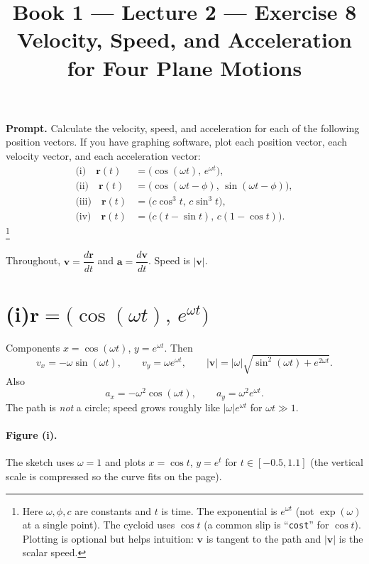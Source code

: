 \documentclass[11pt]{article}
\title{\textbf{Book 1 --- Lecture 2 --- Exercise 8}\\[2mm]
\large Velocity, Speed, and Acceleration for Four Plane Motions}
\author{}
\date{}
\newcommand{\promptbox}[1]{%
  \begin{savenotes}%
  \begingroup\setlength{\fboxsep}{10pt}\noindent
  \colorbox{blue!8}{\parbox{\dimexpr\linewidth-2\fboxsep\relax}{\textbf{Prompt. }#1}}
  \endgroup
  \end{savenotes}%
}
\begin{document}
\maketitle

\promptbox{Calculate the velocity, speed, and acceleration for each of the
following position vectors. If you have graphing software, plot each position
vector, each velocity vector, and each acceleration vector:
\begin{align*}
\text{(i)}\quad \mathbf{r}(t) &= \bigl(\cos(\omega t),\,e^{\omega t}\bigr),\\
\text{(ii)}\quad \mathbf{r}(t) &= \bigl(\cos(\omega t-\phi),\,\sin(\omega t-\phi)\bigr),\\
\text{(iii)}\quad \mathbf{r}(t) &= \bigl(c\cos^3 t,\,c\sin^3 t\bigr),\\
\text{(iv)}\quad \mathbf{r}(t) &= \bigl(c(t-\sin t),\,c(1-\cos t)\bigr).
\end{align*}
\footnote{Here \(\omega,\phi,c\) are constants and \(t\) is time. The exponential
is \(e^{\omega t}\) (not \(\exp(\omega)\) at a single point). The cycloid uses
\(\cos t\) (a common slip is ``\texttt{cost}'' for \(\cos t\)). Plotting is
optional but helps intuition: \(\mathbf{v}\) is tangent to the path and
\(|\mathbf{v}|\) is the scalar speed.}}

Throughout, \(\mathbf{v}=\dfrac{d\mathbf{r}}{dt}\) and
\(\mathbf{a}=\dfrac{d\mathbf{v}}{dt}\). Speed is \(|\mathbf{v}|\).

\section*{(i)\quad \(\mathbf{r}=\bigl(\cos(\omega t),\,e^{\omega t}\bigr)\)}
Components \(x=\cos(\omega t)\), \(y=e^{\omega t}\). Then
\[
v_x=-\omega\sin(\omega t),\qquad v_y=\omega e^{\omega t},
\qquad
|\mathbf{v}|=|\omega|\sqrt{\sin^2(\omega t)+e^{2\omega t}}.
\]
Also
\[
a_x=-\omega^2\cos(\omega t),\qquad a_y=\omega^2 e^{\omega t}.
\]
The path is \emph{not} a circle; speed grows roughly like \(|\omega|e^{\omega t}\)
for \(\omega t\gg 1\).

\paragraph{Figure (i).}
The sketch uses \(\omega=1\) and plots \(x=\cos t\), \(y=e^{t}\) for \(t\in[-0.5,1.1]\)
(the vertical scale is compressed so the curve fits on the page).
\end{document}
